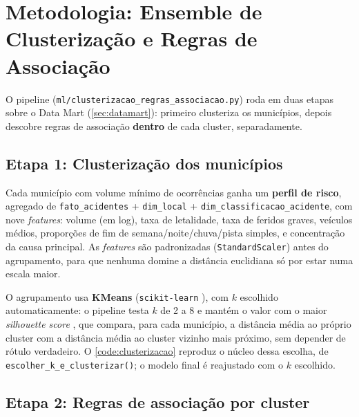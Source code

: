 
\chapter{Metodologia: Ensemble de Clusterização e Regras de Associação}
\label{cap:metodologia}

O pipeline (\texttt{ml/clusterizacao\_regras\_associacao.py}) roda em duas
etapas sobre o Data Mart (\autoref{sec:datamart}): primeiro clusteriza os
municípios, depois descobre regras de associação \textbf{dentro} de cada
cluster, separadamente.

\section{Etapa 1: Clusterização dos municípios}
\label{sec:clusterizacao}

Cada município com volume mínimo de ocorrências ganha um \textbf{perfil de
risco}, agregado de \texttt{fato\_acidentes} + \texttt{dim\_local} +
\texttt{dim\_classificacao\_acidente}, com nove \textit{features}: volume
(em log), taxa de letalidade, taxa de feridos graves, veículos médios,
proporções de fim de semana/noite/chuva/pista simples, e concentração da
causa principal. As \textit{features} são padronizadas
(\texttt{StandardScaler}) antes do agrupamento, para que nenhuma domine a
distância euclidiana só por estar numa escala maior.

O agrupamento usa \textbf{KMeans} \cite{macqueen1967} (\texttt{scikit-learn}
\cite{pedregosa2011}), com $k$ escolhido automaticamente: o pipeline testa
$k$ de 2 a 8 e mantém o valor com o maior \textit{silhouette score}
\cite{rousseeuw1987}, que compara, para cada município, a distância média
ao próprio cluster com a distância média ao cluster vizinho mais próximo,
sem depender de rótulo verdadeiro. O \autoref{code:clusterizacao} reproduz o
núcleo dessa escolha, de \texttt{escolher\_k\_e\_clusterizar()}; o modelo
final é reajustado com o $k$ escolhido.

\begin{center}
  \begin{codigo}[H]
    \small
    
    \caption{Escolha de $k$ por silhueta}
    \label{code:clusterizacao}
  \end{codigo}
\end{center}

\section{Etapa 2: Regras de associação por cluster}
\label{sec:regras}


